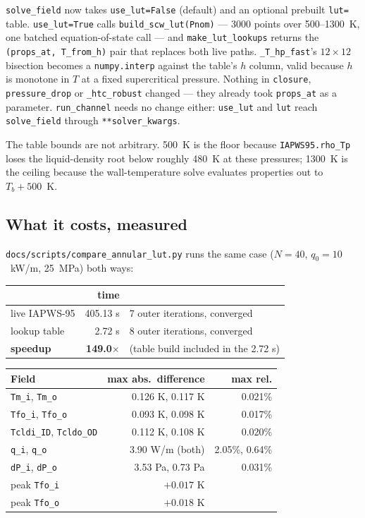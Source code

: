 \documentclass[11pt]{article}
\newcommand{\code}[1]{\texttt{#1}}
\begin{document}
\code{solve\_field} now takes \code{use\_lut=False} (default) and an optional prebuilt
\code{lut=} table. \code{use\_lut=True} calls \code{build\_scw\_lut(Pnom)} --- 3000 points
over 500--1300~K, one batched equation-of-state call --- and \code{make\_lut\_lookups}
returns the \code{(props\_at, T\_from\_h)} pair that replaces both live paths.
\code{\_T\_hp\_fast}'s $12 \times 12$ bisection becomes a \code{numpy.interp} against the
table's $h$ column, valid because $h$ is monotone in $T$ at a fixed supercritical
pressure. Nothing in \code{closure}, \code{pressure\_drop} or \code{\_htc\_robust} changed
--- they already took \code{props\_at} as a parameter. \code{run\_channel} needs no change
either: \code{use\_lut} and \code{lut} reach \code{solve\_field} through
\code{**solver\_kwargs}.

The table bounds are not arbitrary. 500~K is the floor because \code{IAPWS95.rho\_Tp}
loses the liquid-density root below roughly 480~K at these pressures; 1300~K is the
ceiling because the wall-temperature solve evaluates properties out to $T_b + 500$~K.

\subsection{What it costs, measured}

\code{docs/scripts/compare\_annular\_lut.py} runs the same case ($N = 40$, $q_0 = 10$~kW/m,
25~MPa) both ways:

\begin{center}
\begin{tabular}{lrl}
\toprule
& time & \\
\midrule
live IAPWS-95 & 405.13 s & 7 outer iterations, converged \\
lookup table & 2.72 s & 8 outer iterations, converged \\
\midrule
\textbf{speedup} & \textbf{149.0$\times$} & (table build included in the 2.72 s) \\
\bottomrule
\end{tabular}
\end{center}

\begin{center}
\begin{tabular}{lrr}
\toprule
Field & max abs.\ difference & max rel. \\
\midrule
\code{Tm\_i}, \code{Tm\_o} & 0.126 K, 0.117 K & 0.021\% \\
\code{Tfo\_i}, \code{Tfo\_o} & 0.093 K, 0.098 K & 0.017\% \\
\code{Tcldi\_ID}, \code{Tcldo\_OD} & 0.112 K, 0.108 K & 0.020\% \\
\code{q\_i}, \code{q\_o} & 3.90 W/m (both) & 2.05\%, 0.64\% \\
\code{dP\_i}, \code{dP\_o} & 3.53 Pa, 0.73 Pa & 0.031\% \\
\midrule
peak \code{Tfo\_i} & $+0.017$ K & \\
peak \code{Tfo\_o} & $+0.018$ K & \\
\bottomrule
\end{tabular}
\end{center}
\end{document}
